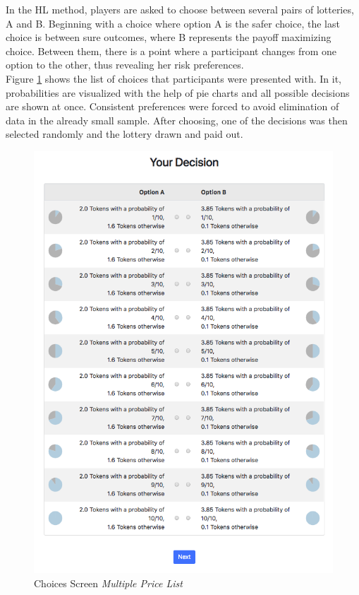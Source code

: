      In the HL method, players are asked to choose between several pairs of lotteries, A and B. Beginning with a choice where option A is the safer choice, the last choice is between sure outcomes, where B represents the payoff maximizing choice. Between them, there is a point where a participant changes from one option to the other, thus revealing her risk preferences.\\
     Figure \ref{fig:choices_mpl} shows the list of choices that participants were presented with. In it, probabilities are visualized with the help of pie charts and all possible decisions are shown at once. Consistent preferences were forced to avoid elimination of data in the already small sample. After choosing, one of the decisions was then selected randomly and the lottery drawn and paid out.\\
     
     \begin{figure}
         \centering
         \includegraphics[width=\textwidth]{graphs/Choices_MPL.png}
         \caption{Choices Screen \textit{Multiple Price List}}
         \label{fig:choices_mpl}
     \end{figure}
     
